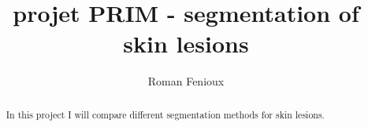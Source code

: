 \documentclass[a4paper,10pt]{article}
\title{projet PRIM - segmentation of skin lesions}
\author{Roman Fenioux}
\begin{document}
\maketitle

\begin{abstract}
In this project I will compare different segmentation methods for skin lesions.
\end{abstract}

\section{}
\end{document}
